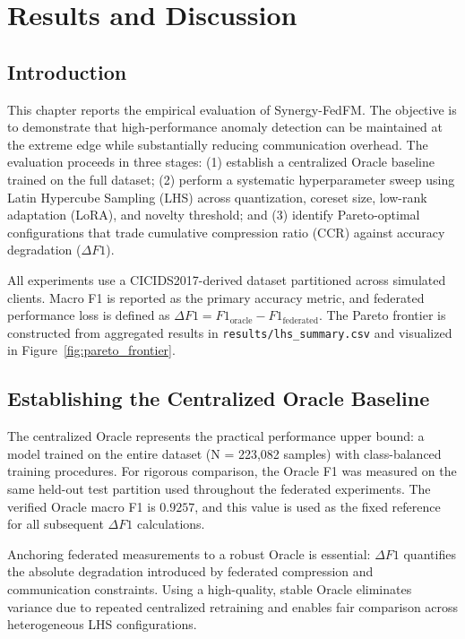 \chapter{Results and Discussion}
\label{ch:results}

\section{Introduction}
This chapter reports the empirical evaluation of Synergy-FedFM. The objective is to demonstrate that high-performance anomaly detection can be maintained at the extreme edge while substantially reducing communication overhead. The evaluation proceeds in three stages: (1) establish a centralized Oracle baseline trained on the full dataset; (2) perform a systematic hyperparameter sweep using Latin Hypercube Sampling (LHS) across quantization, coreset size, low-rank adaptation (LoRA), and novelty threshold; and (3) identify Pareto-optimal configurations that trade cumulative compression ratio (CCR) against accuracy degradation ($\Delta F1$).

All experiments use a CICIDS2017-derived dataset partitioned across simulated clients. Macro F1 is reported as the primary accuracy metric, and federated performance loss is defined as $\Delta F1 = F1_{\text{oracle}} - F1_{\text{federated}}$. The Pareto frontier is constructed from aggregated results in \texttt{results/lhs_summary.csv} and visualized in Figure~\ref{fig:pareto_frontier}.

\section{Establishing the Centralized Oracle Baseline}
The centralized Oracle represents the practical performance upper bound: a model trained on the entire dataset (N = 223,082 samples) with class-balanced training procedures. For rigorous comparison, the Oracle F1 was measured on the same held-out test partition used throughout the federated experiments. The verified Oracle macro F1 is $0.9257$, and this value is used as the fixed reference for all subsequent $\Delta F1$ calculations.

Anchoring federated measurements to a robust Oracle is essential: $\Delta F1$ quantifies the absolute degradation introduced by federated compression and communication constraints. Using a high-quality, stable Oracle eliminates variance due to repeated centralized retraining and enables fair comparison across heterogeneous LHS configurations.

